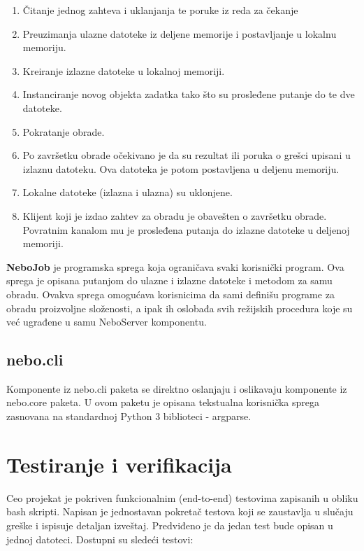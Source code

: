 \documentclass[a4paper]{article}
\begin{document}
\begin{enumerate}
\item Čitanje jednog zahteva i uklanjanja te poruke iz reda za čekanje
\item Preuzimanja ulazne datoteke iz deljene memorije i postavljanje u lokalnu
  memoriju.
\item Kreiranje izlazne datoteke u lokalnoj memoriji.
\item Instanciranje novog objekta zadatka tako što su prosleđene putanje do te
  dve datoteke.
\item Pokratanje obrade.
\item Po završetku obrade očekivano je da su rezultat ili poruka o grešci
  upisani u izlaznu datoteku. Ova datoteka je potom postavljena u deljenu
  memoriju.
\item Lokalne datoteke (izlazna i ulazna) su uklonjene.
\item Klijent koji je izdao zahtev za obradu je obavešten o završetku obrade.
  Povratnim kanalom mu je prosleđena putanja do izlazne datoteke u deljenoj memoriji.
\end{enumerate}

{\bf NeboJob} je programska sprega koja ograničava svaki korisnički program. Ova
sprega je opisana putanjom do ulazne i izlazne datoteke i metodom za samu
obradu. Ovakva sprega omogućava korisnicima da sami definišu programe za obradu
proizvoljne složenosti, a ipak ih oslobađa svih režijskih procedura koje su već
ugrađene u samu NeboServer komponentu.

\subsection{nebo.cli}

Komponente iz nebo.cli paketa se direktno oslanjaju i oslikavaju komponente iz
nebo.core paketa. U ovom paketu je opisana tekstualna korisnička sprega
zasnovana na standardnoj Python 3 biblioteci - argparse.

\section{Testiranje i verifikacija}

Ceo projekat je pokriven funkcionalnim (end-to-end) testovima zapisanih u
obliku bash skripti. Napisan je jednostavan pokretač testova koji se zaustavlja
u slučaju greške i ispisuje detaljan izveštaj. Predviđeno je da jedan test bude
opisan u jednoj datoteci. Dostupni su sledeći testovi:
\end{document}
